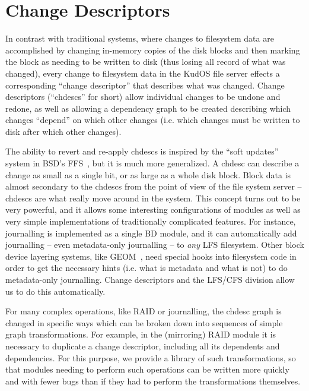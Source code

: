 \section{Change Descriptors}
\label{sec:chdescs}

In contrast with traditional systems, where changes to filesystem data are
accomplished by changing in-memory copies of the disk blocks and then marking
the block as needing to be written to disk (thus losing all record of what was
changed), every change to filesystem data in the KudOS file server effects a
corresponding ``change descriptor'' that describes what was changed. Change
descriptors (``chdescs'' for short) allow individual changes to be undone and
redone, as well as allowing a dependency graph to be created describing which
changes ``depend'' on which other changes (i.e. which changes must be written to
disk after which other changes).

The ability to revert and re-apply chdescs is inspired by the ``soft updates''
system in BSD's FFS~\cite{ganger00soft}, but it is much more generalized. A
chdesc can describe a change as small as a single bit, or as large as a whole
disk block. Block data is almost secondary to the chdescs from the point of view
of the file system server -- chdescs are what really move around in the system.
This concept turns out to be very powerful, and it allows some interesting
configurations of modules as well as very simple implementations of
traditionally complicated features. For instance, journalling is implemented as
a single BD module, and it can automatically add journalling -- even
metadata-only journalling -- to {\it any} LFS filesystem. Other block device
layering systems, like GEOM~\cite{geom}, need special hooks into filesystem code
in order to get the necessary hints (i.e. what is metadata and what is not) to
do metadata-only journalling. Change descriptors and the LFS/CFS division allow
us to do this automatically.

For many complex operations, like RAID or journalling, the chdesc graph is
changed in specific ways which can be broken down into sequences of simple graph
transformations. For example, in the (mirroring) RAID module it is necessary to
duplicate a change descriptor, including all its dependents and dependencies.
For this purpose, we provide a library of such transformations, so that modules
needing to perform such operations can be written more quickly and with fewer
bugs than if they had to perform the transformations themselves.
